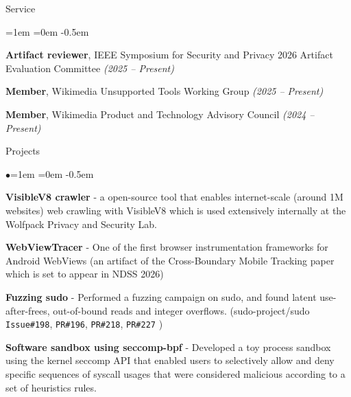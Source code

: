 \documentclass{resume} %
\begin{document}
\begin{rSection}{Service}
\begin{list}{}{\leftmargin=1em \itemindent=0em}
\itemsep -0.5em
\item {\bf Artifact reviewer}, IEEE Symposium for Security and Privacy 2026 Artifact Evaluation Committee \hfill {\em (2025 -- Present)}
\item {\bf Member}, Wikimedia Unsupported Tools Working Group \hfill {\em (2025 -- Present)}
\item {\bf Member}, Wikimedia Product and Technology Advisory Council \hfill {\em (2024 -- Present)}
\end{list}
\end{rSection}
\begin{rSection}{Projects}
\begin{list}{$\bullet$}{\leftmargin=1em \itemindent=0em}
\itemsep -0.5em
\item {\bf VisibleV8 crawler} - a open-source tool that enables internet-scale (around 1M websites) web crawling with VisibleV8 which is used extensively internally at the Wolfpack Privacy and Security Lab.
\item {\bf WebViewTracer} - One of the first browser instrumentation frameworks for Android WebViews (an artifact of the Cross-Boundary Mobile Tracking paper which is set to appear in NDSS 2026)
\item {\bf Fuzzing sudo} - Performed a fuzzing campaign on sudo, and found latent use-after-frees, out-of-bound reads and integer overflows. (sudo-project/sudo \texttt{Issue\#198}, \texttt{PR\#196}, \texttt{PR\#218}, \texttt{PR\#227} )
\item {\bf Software sandbox using seccomp-bpf} - Developed a toy process sandbox using the kernel seccomp API that enabled users to selectively allow and deny specific sequences of syscall usages that were considered malicious according to a set of heuristics rules.
\end{list}
\end{rSection}
\end{document}
